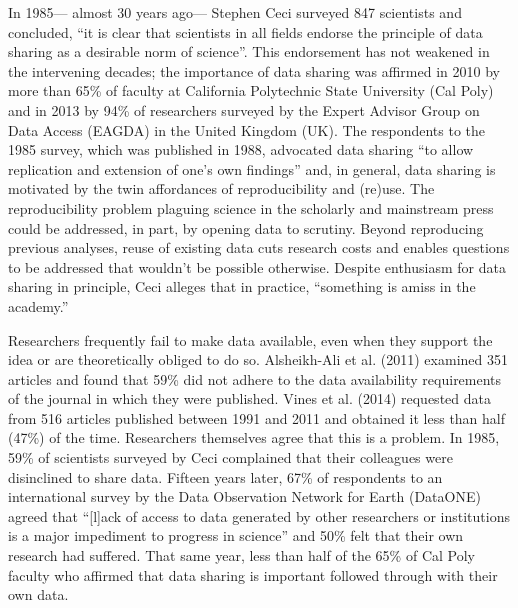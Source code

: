 \documentclass[10pt]{article}
\begin{document}
In 1985--- almost 30 years ago--- Stephen Ceci surveyed 847 scientists and concluded, ``it is clear that scientists in all fields endorse the principle of data sharing as a desirable norm of science''\cite{ceci_scientists_1988}.
This endorsement has not weakened in the intervening decades; the importance of data sharing was affirmed in 2010 by more than 65\% of faculty at California Polytechnic State University (Cal Poly)\cite{scaramozzino_study_2012} and in 2013 by 94\% of researchers surveyed by the Expert Advisor Group on Data Access (EAGDA) in the United Kingdom (UK)\cite{bobrow_establishing_2014}.
The respondents to the 1985 survey, which was published in 1988, advocated data sharing ``to allow replication and extension of one's own findings''\cite{ceci_scientists_1988} and, in general, data sharing is motivated by the twin affordances of reproducibility and (re)use.
The reproducibility problem plaguing science in the scholarly\cite{ioannidis_why_2005, prinz_believe_2011, mobley_survey_2013} and mainstream\cite{zimmer_rise_2012, _how_2013, editors_trouble_2013} press could be addressed, in part, by opening data to scrutiny\cite{drew_lost_2013, collins_nih_2014}.
Beyond reproducing previous analyses, reuse of existing data cuts research costs\cite{piwowar_data_2011} and enables questions to be addressed that wouldn't be possible otherwise\cite{stewart_meta-analysis_2010, borenstein_introduction_2011}.
Despite enthusiasm for data sharing in principle, Ceci alleges that in practice, ``something is amiss in the academy.''

Researchers frequently fail to make data available, even when they support the idea or are theoretically obliged to do so.
Alsheikh-Ali et al. (2011) examined 351 articles and found that 59\% did not adhere to the data availability requirements of the journal in which they were published.
Vines et al. (2014) requested data from 516 articles published between 1991 and 2011 and obtained it less than half (47\%) of the time\cite{vines_availability_2014}.
Researchers themselves agree that this is a problem.
In 1985, 59\% of scientists surveyed by Ceci complained that their colleagues were disinclined to share data\cite{ceci_scientists_1988}.
Fifteen years later, 67\% of respondents to an international survey by the Data Observation Network for Earth (DataONE) agreed that ``[l]ack of access to data generated by other researchers or institutions is a major impediment to progress in science'' and 50\% felt that their own research had suffered\cite{tenopir_data_2011}.
That same year, less than half of the 65\% of Cal Poly faculty who affirmed that data sharing is important followed through with their own data\cite{scaramozzino_study_2012}.
\end{document}
